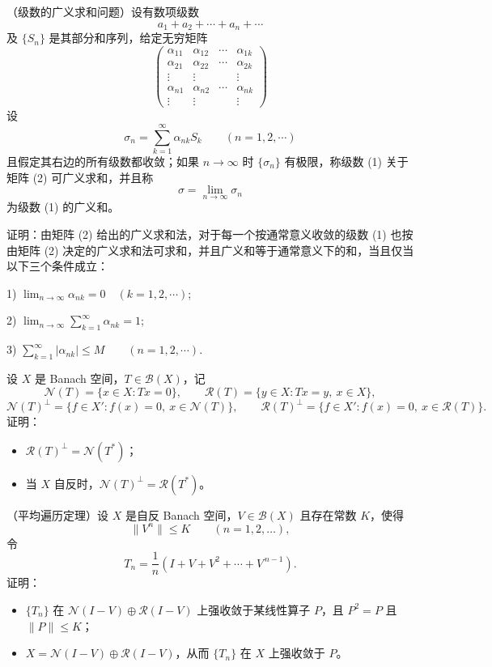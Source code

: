 \begin{homework}[3.24]
（级数的广义求和问题）设有数项级数
\[
a_1+a_2+\cdots+a_n+\cdots
\]
及 $\{S_n\}$ 是其部分和序列，给定无穷矩阵
\[
\left(
\begin{array}{cccc}
\alpha_{11} & \alpha_{12} & \cdots & \alpha_{1k} \\
\alpha_{21} & \alpha_{22} & \cdots & \alpha_{2k} \\
\vdots      & \vdots      &        & \vdots      \\
\alpha_{n1} & \alpha_{n2} & \cdots & \alpha_{nk} \\
\vdots      & \vdots      &        & \vdots
\end{array}
\right)
\tag{2}
\]
设
\[
\sigma_n=\sum_{k=1}^\infty \alpha_{nk} S_k \qquad (n=1,2,\cdots)
\]
且假定其右边的所有级数都收敛；如果 $n\to\infty$ 时 $\{\sigma_n\}$ 有极限，称级数 (1) 关于矩阵 (2) 可广义求和，并且称 
\[
\sigma=\lim_{n\to\infty}\sigma_n
\]
为级数 (1) 的广义和。

证明：由矩阵 (2) 给出的广义求和法，对于每一个按通常意义收敛的级数 (1) 也按由矩阵 (2) 决定的广义求和法可求和，并且广义和等于通常意义下的和，当且仅当以下三个条件成立：

1) \(\displaystyle \lim_{n\to\infty} \alpha_{nk}=0 \quad (k=1,2,\cdots)\);

2) \(\displaystyle \lim_{n\to\infty} \sum_{k=1}^\infty \alpha_{nk}=1\);

3) \(\displaystyle \sum_{k=1}^\infty |\alpha_{nk}| \le M \qquad (n=1,2,\cdots).\)
\end{homework}
\begin{homework}[3.25]
设 $X$ 是 Banach 空间，$T\in\mathcal{B}(X)$，记  
\[
\mathcal{N}(T)=\{x\in X:Tx=0\},\qquad 
\mathcal{R}(T)=\{y\in X:T x=y,\ x\in X\},
\]
\[
\mathcal{N}(T)^\perp=\{f\in X': f(x)=0,\ x\in\mathcal{N}(T)\},\qquad
\mathcal{R}(T)^\perp=\{f\in X': f(x)=0,\ x\in\mathcal{R}(T)\}.
\]
证明：
\begin{itemize}
    \item[(1)] $\mathcal{R}(T)^\perp=\mathcal{N}(T^*)$；
    \item[(2)] 当 $X$ 自反时，$\mathcal{N}(T)^\perp=\mathcal{R}(T^*)$。
\end{itemize}
\end{homework}

\begin{homework}[3.26]
（平均遍历定理）设 $X$ 是自反 Banach 空间，$V\in\mathcal{B}(X)$ 且存在常数 $K$，使得  
\[
\|V^n\|\le K \qquad (n=1,2,\ldots),
\]
令  
\[
T_n=\frac1n(I+V+V^2+\cdots+V^{\,n-1}).
\]
证明：
\begin{itemize}
    \item[(1)] $\{T_n\}$ 在 $\mathcal{N}(I-V)\oplus \mathcal{R}(I-V)$ 上强收敛于某线性算子 $P$，且 $P^2=P$ 且 $\|P\|\le K$；
    \item[(2)] $X=\mathcal{N}(I-V)\oplus \mathcal{R}(I-V)$，从而 $\{T_n\}$ 在 $X$ 上强收敛于 $P$。
\end{itemize}
\end{homework}

